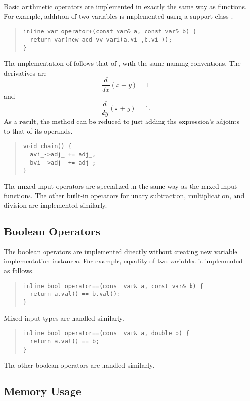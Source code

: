 \documentclass[10pt]{article}
\begin{document}
Basic arithmetic operators are implemented in exactly the same way as
functions.  For example, addition of two variables is implemented
using a support class .
%
\begin{quote}
\begin{Verbatim}
inline var operator+(const var& a, const var& b) {    
  return var(new add_vv_vari(a.vi_,b.vi_));
}
\end{Verbatim}
\end{quote}
%
The implementation of  follows that of ,
with the same naming conventions.  The derivatives are
\[
\frac{d}{dx} \left( x + y \right) = 1
\]
and
\[
\frac{d}{dy} \left( x + y \right) = 1.
\]
As a result, the  method can be reduced to just adding
the expression's adjoints to that of its operands.
%
\begin{quote}
\begin{Verbatim}
void chain() {
  avi_->adj_ += adj_;
  bvi_->adj_ += adj_;
}
\end{Verbatim}
\end{quote}
%
The mixed input operators are specialized in the same way as the mixed
input functions.  The other built-in operators for unary subtraction,
multiplication, and division are implemented similarly.

\subsection{Boolean Operators}

The boolean operators are implemented directly without creating new
variable implementation instances.  For example, equality of two
variables is implemented as follows.
%
\begin{quote}
\begin{Verbatim}
inline bool operator==(const var& a, const var& b) {
  return a.val() == b.val();
}
\end{Verbatim}
\end{quote}
%
Mixed input types are handled similarly.
%
\begin{quote}
\begin{Verbatim}
inline bool operator==(const var& a, double b) {
  return a.val() == b;
}
\end{Verbatim}
\end{quote}
%
The other boolean operators are handled similarly.



\subsection{Memory Usage}
\end{document}
